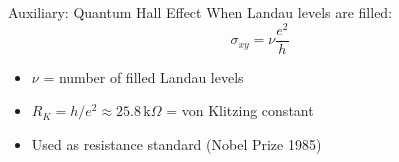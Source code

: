 \documentclass[aspectratio=169, 14pt, t]{beamer}
\begin{document}
\begin{frame}{Auxiliary: Quantum Hall Effect}
    When Landau levels are filled:
    \[
        \sigma_{xy} = \nu \frac{e^2}{h}
    \]
    \vspace{0.3cm}
    \begin{itemize}
        \item $\nu$ = number of filled Landau levels
        \item $R_K = h/e^2 \approx 25.8\,\text{k}\Omega$ = von Klitzing constant
        \item Used as resistance standard (Nobel Prize 1985)
    \end{itemize}
\end{frame}
\end{document}
